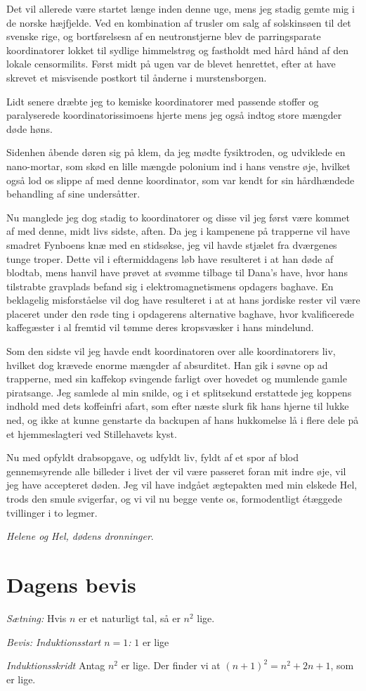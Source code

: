 \begin{minipage}[t]{150mm}
Det vil allerede være startet længe inden denne uge, mens jeg stadig gemte mig i de norske hæjfjelde. Ved en kombination af trusler om salg af solskinsøen til det svenske rige, og bortførelsesn af en neutronstjerne blev de parringsparate koordinatorer lokket til sydlige himmelstrøg og fastholdt med hård hånd af den lokale censormilits. Først midt på ugen var de blevet henrettet, efter at have skrevet et misvisende postkort til ånderne i murstensborgen.

Lidt senere dræbte jeg to kemiske koordinatorer med passende stoffer og paralyserede koordinatorissimoens hjerte mens jeg også indtog store mængder døde høns.

Sidenhen åbende døren sig på klem, da jeg mødte fysiktroden, og udviklede en nano-mortar, som skød en lille mængde polonium ind i hans venstre øje, hvilket også lod os slippe af med denne koordinator, som var kendt for sin hårdhændede behandling af sine undersåtter.

Nu manglede jeg dog stadig to koordinatorer og disse vil jeg først være kommet af med denne, midt livs sidste, aften. Da jeg i kampenene på trapperne vil have smadret Fynboens knæ med en stidsøkse, jeg vil havde stjælet fra dværgenes tunge troper. Dette vil i eftermiddagens løb have resulteret i at han døde af blodtab, mens hanvil have prøvet at svømme tilbage til Dana's have, hvor hans tilstrabte gravplads befand sig i elektromagnetismens opdagers baghave. En beklagelig misforståelse vil dog have resulteret i at at hans jordiske rester vil være placeret under den røde ting i opdagerens alternative baghave, hvor kvalificerede kaffegæster i al fremtid vil tømme deres kropsvæsker i hans mindelund.

Som den sidste vil jeg havde endt koordinatoren over alle koordinatorers liv, hvilket dog krævede enorme mængder af absurditet. Han gik i søvne op ad trapperne, med sin kaffekop svingende farligt over hovedet og mumlende gamle piratsange. Jeg samlede al min snilde, og i et splitsekund erstattede jeg koppens indhold med dets koffeinfri afart, som efter næste slurk fik hans hjerne til lukke ned, og ikke at kunne genstarte da backupen af hans hukkomelse lå i flere dele på et hjemmeslagteri ved Stillehavets kyst.

Nu med opfyldt drabsopgave, og udfyldt liv, fyldt af et spor af blod gennemsyrende alle billeder i livet der vil være passeret foran mit indre øje, vil jeg have accepteret døden. Jeg vil have indgået ægtepakten med min elskede Hel, trods den smule svigerfar, og vi vil nu begge vente os, formodentligt étæggede tvillinger i to legmer. 

\emph{Helene og Hel, dødens dronninger}. 

\section*{Dagens bevis}
\emph{Sætning:} Hvis $n$ er et naturligt tal, så er $n^2$ lige.

\emph{Bevis: Induktionsstart $n=1$:} $1$ er lige

\emph{Induktionsskridt} Antag $n^2$ er lige. Der finder vi at $(n+1)^2=n^2+2n+1$, som er lige.
 

\end{minipage}
